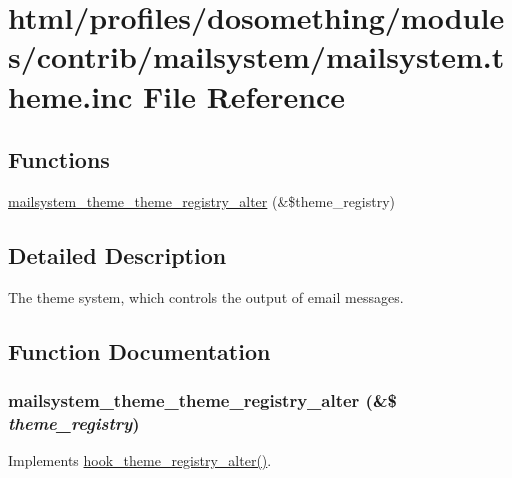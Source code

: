 \hypertarget{mailsystem_8theme_8inc}{
\section{html/profiles/dosomething/modules/contrib/mailsystem/mailsystem.theme.inc File Reference}
\label{mailsystem_8theme_8inc}
}
\subsection*{Functions}
\begin{DoxyCompactItemize}
\item 
\hyperlink{mailsystem_8theme_8inc_a641369522a5e897ab11ac5a31c01fd3b}{mailsystem\_\-theme\_\-theme\_\-registry\_\-alter} (\&\$theme\_\-registry)
\end{DoxyCompactItemize}


\subsection{Detailed Description}
The theme system, which controls the output of email messages. 

\subsection{Function Documentation}
\hypertarget{mailsystem_8theme_8inc_a641369522a5e897ab11ac5a31c01fd3b}{
\subsubsection[{mailsystem\_\-theme\_\-theme\_\-registry\_\-alter}]{\setlength{\rightskip}{0pt plus 5cm}mailsystem\_\-theme\_\-theme\_\-registry\_\-alter (\&\$ {\em theme\_\-registry})}}
\label{mailsystem_8theme_8inc_a641369522a5e897ab11ac5a31c01fd3b}
Implements \hyperlink{group__hooks_gadd6cabb9ce825efccefb4918321932a5}{hook\_\-theme\_\-registry\_\-alter()}. 
